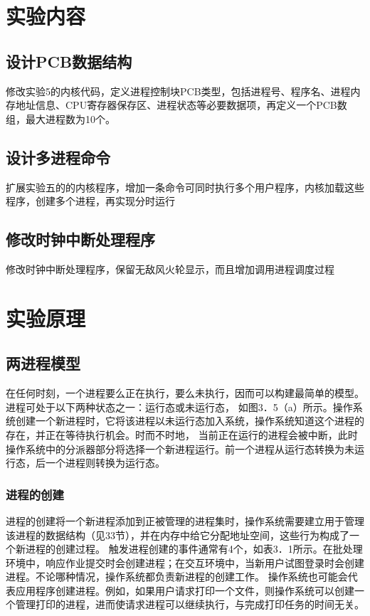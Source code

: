 \documentclass[a4paper, 11pt]{article} %
\begin{document}
\section{实验内容}

\subsection{设计PCB数据结构}

修改实验5的内核代码，定义进程控制块PCB类型，包括进程号、程序名、进程内存地址信息、CPU寄存器保存区、进程状态等必要数据项，再定义一个PCB数组，最大进程数为10个。

\subsection{设计多进程命令}

扩展实验五的的内核程序，增加一条命令可同时执行多个用户程序，内核加载这些程序，创建多个进程，再实现分时运行

\subsection{修改时钟中断处理程序}

修改时钟中断处理程序，保留无敌风火轮显示，而且增加调用进程调度过程

\section{实验原理}
\subsection{两进程模型}
在任何时刻，一个进程要么正在执行，要么未执行，因而可以构建最简单的模型。进程可处于以下两种状态之一：运行态或未运行态，
如图3．5（a）所示。操作系统创建一个新进程时，它将该进程以未运行态加入系统，操作系统知道这个进程的存在，并正在等待执行机会。时而不时地，
当前正在运行的进程会被中断，此时操作系统中的分派器部分将选择一个新进程运行。前一个进程从运行态转换为未运行态，后一个进程则转换为运行态。\cite{gityuan2016}

\subsubsection{进程的创建}
进程的创建将一个新进程添加到正被管理的进程集时，操作系统需要建立用于管理该进程的数据结构（见33节），并在内存中给它分配地址空间，这些行为构成了一个新进程的创建过程。
触发进程创建的事件通常有4个，如表3．1所示。在批处理环境中，响应作业提交时会创建进程；在交互环境中，当新用户试图登录时会创建进程。不论哪种情况，操作系统都负责新进程的创建工作。
操作系统也可能会代表应用程序创建进程。例如，如果用户请求打印一个文件，则操作系统可以创建一个管理打印的进程，进而使请求进程可以继续执行，与完成打印任务的时间无关。
\end{document}
